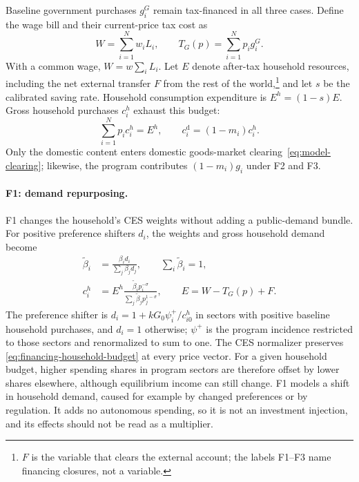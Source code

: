 Baseline government purchases $g_i^G$ remain tax-financed in all three cases. Define the wage bill and their current-price tax cost as 
\begin{equation}
  W = \sum_{i=1}^N w_i L_i, \qquad T_G(p) = \sum_{i=1}^N p_i g_i^G. \label{eq:financing-baseline-budget} 
\end{equation}
With a common wage, $W = w\sum_i L_i$. Let $E$ denote after-tax household resources, including the net external transfer $F$ from the rest of the world,\footnote{$F$ is the variable that clears the external account; the labels F1--F3 name financing closures, not a variable.} and let $s$ be the calibrated saving rate. Household consumption expenditure is $E^h = (1-s)E$. Gross household purchases $c_i^h$ exhaust this budget:
\begin{equation} 
\sum_{i=1}^N p_i c_i^h = E^h, \qquad c_i^{\mathrm{d}} = (1-m_i)c_i^h. \label{eq:financing-household-budget}
\end{equation}
Only the domestic content enters domestic goods-market clearing~\eqref{eq:model-clearing}; likewise, the program contributes $(1-m_i)g_i$ under F2 and F3.

\paragraph{F1: demand repurposing.}
F1 changes the household's CES weights without adding a public-demand
bundle. For positive preference shifters $d_i$, the weights and gross
household demand become
\begin{align}
\widetilde{\beta}_i
 &= \frac{\beta_i d_i}{\sum_j\beta_j d_j},
\qquad \sum_i\widetilde{\beta}_i = 1,
\label{eq:closure-f1-weights}\\
c_i^h
 &= E^h\frac{\widetilde{\beta}_i p_i^{-\sigma}}
 {\sum_j\widetilde{\beta}_j p_j^{1-\sigma}},
\qquad E = W-T_G(p)+F.
\label{eq:closure-f1}
\end{align}
The preference shifter is $d_i = 1+kG_0\psi_i^+/c_{i0}^h$ in sectors with positive baseline household purchases, and $d_i=1$ otherwise; $\psi^+$ is the program incidence restricted to those sectors and renormalized to sum to one. The CES normalizer preserves \eqref{eq:financing-household-budget} at every price vector. For a given household budget, higher spending shares in program sectors are therefore offset by lower shares elsewhere, although equilibrium income can still change. F1 models a shift in household demand, caused for example by changed preferences or by regulation. It adds no autonomous spending, so it is not an investment injection, and its effects should not be read as a multiplier.

